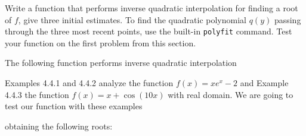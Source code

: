\begin{statement}{2}
  Write a function that performs inverse quadratic interpolation for
  finding a root of $f$, give three initial estimates.
  To find the quadratic polynomial $q(y)$ passing through the three most recent points,
  use the built-in \texttt{polyfit} command.
  Test your function on the first problem from this section.
\end{statement}

\begin{solution}
  The following function performs inverse quadratic interpolation
  
  Examples 4.4.1 and 4.4.2 analyze the function $f(x) = x e^x - 2$
  and Example 4.4.3 the function $f(x) = x + \cos(10x)$ with real domain.
  We are going to test our function with these examples
  
  obtaining the following roots:
  
\end{solution}
